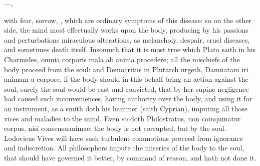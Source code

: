 {{---,

with fear, sorrow, \etc{}, which are ordinary symptoms of this disease: so
on the other side, the mind most effectually works upon the body,
producing by his passions and perturbations miraculous alterations, as
melancholy, despair, cruel diseases, and sometimes death itself.
Insomuch that it is most true which Plato saith in his Charmides, omnia
corporis mala ab anima procedere; all the mischiefs of the body
proceed from the soul: and Democritus in Plutarch urgeth,
Damnatam iri animam a corpore, if the body should in this behalf bring
an action against the soul, surely the soul would be cast and
convicted, that by her supine negligence had caused such
inconveniences, having authority over the body, and using it for an
instrument, as a smith doth his hammer (saith Cyprian), imputing
all those vices and maladies to the mind. Even so doth
Philostratus, non coinquinatur corpus, nisi consensuanimae; the
body is not corrupted, but by the soul. Lodovicus Vives will have such
turbulent commotions proceed from ignorance and indiscretion. All
philosophers impute the miseries of the body to the soul, that should
have governed it better, by command of reason, and hath not done it.

}}
